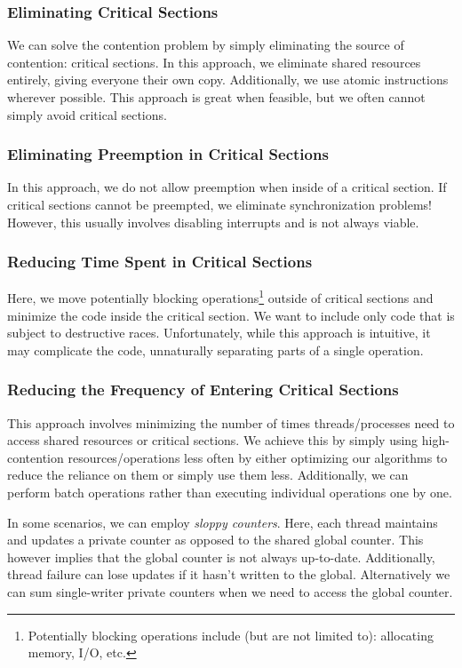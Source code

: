 \documentclass{report}
\begin{document}
\subsubsection{Eliminating Critical Sections}
We can solve the contention problem by simply eliminating the source of contention: critical
sections. In this approach, we eliminate shared resources entirely, giving everyone their own
copy. Additionally, we use atomic instructions wherever possible. This approach is great when
feasible, but we often cannot simply avoid critical sections.


\subsubsection{Eliminating Preemption in Critical Sections}
In this approach, we do not allow preemption when inside of a critical section. If critical sections
cannot be preempted, we eliminate synchronization problems! However, this usually involves disabling
interrupts and is not always viable.


\subsubsection{Reducing Time Spent in Critical Sections}
Here, we move potentially blocking operations\footnote{Potentially blocking operations include (but
  are not limited to): allocating memory, I/O, etc.} outside of critical sections and minimize the
code inside the critical section. We want to include only code that is subject to destructive
races. Unfortunately, while this approach is intuitive, it may complicate the code, unnaturally
separating parts of a single operation.


\subsubsection{Reducing the Frequency of Entering Critical Sections}
This approach involves minimizing the number of times threads/processes need to access shared
resources or critical sections. We achieve this by simply using high-contention resources/operations
less often by either optimizing our algorithms to reduce the reliance on them or simply use them
less. Additionally, we can perform batch operations rather than executing individual operations one
by one.

In some scenarios, we can employ \textit{sloppy counters}. Here, each thread maintains and updates a
private counter as opposed to the shared global counter. This however implies that the global
counter is not always up-to-date. Additionally, thread failure can lose updates if it hasn't written
to the global. Alternatively we can sum single-writer private counters when we need to access the
global counter.
\end{document}
